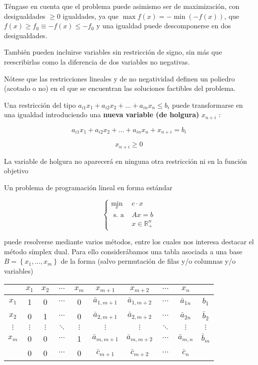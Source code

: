 \documentclass[openany]{book}
\begin{document}
Téngase en cuenta que el problema puede asimismo ser de maximización, con desigualdades $\geq 0$ igualdades, ya que $\max f(x)=-\min (-f(x))$, que $f(x) \geq f_{0} \equiv-f(x) \leq-f_{0}$ y una igualdad puede descomponerse en dos desigualdades.

También pueden incluirse variables sin restricción de signo, sin más que reescribirlas como la diferencia de dos variables no negativas.

Nótese que las restricciones lineales y de no negatividad definen un poliedro (acotado o no) en el que se encuentran las soluciones factibles del problema.

Una restricción del tipo $a_{i 1} x_{1}+a_{i 2} x_{2}+\ldots+a_{i n} x_{n} \leq b_{i}$ puede transformarse en una igualdad introduciendo una \textbf{nueva variable (de holgura)} $x_{n+i}$ :

$$
a_{i 1} x_{1}+a_{i 2} x_{2}+\ldots+a_{i n} x_{n}+x_{n+i}=b_{i}
$$

$$
x_{n+i} \geq 0
$$

La variable de holgura no aparecerá en ninguna otra restricción ni en la función objetivo

Un problema de programación lineal en forma estándar

$$
\begin{cases}\min _{x} & c \cdot x \\ \text { s. a } & A x=b \\ \quad & x \in \mathbb{R}_{+}^{n}\end{cases}
$$

puede resolverse mediante varios métodos, entre los cuales nos interesa destacar el método símplex dual. Para ello considerábamos una tabla asociada a una base $B=\left\{x_{1}, \ldots, x_{m}\right\}$ de la forma (salvo permutación de filas y/o columnas y/o variables)

\begin{tabular}{c|cccccccc|c}
\hline & $x_{1}$ & $x_{2}$ & $\cdots$ & $x_{m}$ & $x_{m+1}$ & $x_{m+2}$ & $\cdots$ & $x_{n}$ & \\
\hline$x_{1}$ & 1 & 0 & $\cdots$ & 0 & $\bar{a}_{1, m+1}$ & $\bar{a}_{1, m+2}$ & $\cdots$ & $\bar{a}_{1 n}$ & $b_{1}$ \\
$x_{2}$ & 0 & 1 & $\cdots$ & 0 & $\bar{a}_{2, m+1}$ & $\bar{a}_{2, m+2}$ & $\cdots$ & $\bar{a}_{2 n}$ & $\bar{b}_{2}$ \\
$\vdots$ & $\vdots$ & $\vdots$ & $\ddots$ & $\vdots$ & $\vdots$ & $\vdots$ & $\ddots$ & $\vdots$ & $\vdots$ \\
$x_{m}$ & 0 & 0 & $\cdots$ & 1 & $\bar{a}_{m, m+1}$ & $\bar{a}_{m, m+2}$ & $\cdots$ & $\bar{a}_{m, n}$ & $\bar{b}_{m}$ \\
\hline & 0 & 0 & $\cdots$ & 0 & $\bar{c}_{m+1}$ & $\bar{c}_{m+2}$ & $\cdots$ & $\bar{c}_{n}$ & \\
\hline
\end{tabular}
\end{document}
